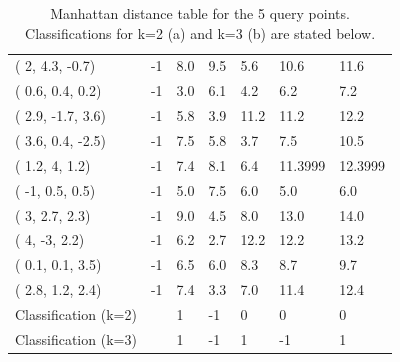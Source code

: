 \documentclass[12pt]{article}
\begin{document}
\begin{table}[h!]
\begin{tabular}{lllllll}
( 2, 4.3, -0.7)      & -1    & 8.0                         & 9.5                         & 5.6                         & 10.6                        & 11.6                           \\
( 0.6, 0.4, 0.2)     & -1    & 3.0                         & 6.1                         & 4.2                         & 6.2                         & 7.2                            \\
( 2.9, -1.7, 3.6)    & -1    & 5.8                         & \cellcolor[HTML]{FFCC67}3.9 & 11.2                        & 11.2                        & 12.2                           \\
( 3.6, 0.4, -2.5)    & -1    & 7.5                         & 5.8                         & \cellcolor[HTML]{FFFE65}3.7 & 7.5                         & 10.5                           \\
( 1.2, 4, 1.2)       & -1    & 7.4                         & 8.1                         & 6.4                         & 11.3999                     & 12.3999                        \\
( -1, 0.5, 0.5)      & -1    & 5.0                         & 7.5                         & 6.0                         & 5.0                         & 6.0                            \\
( 3, 2.7, 2.3)       & -1    & 9.0                         & 4.5                         & 8.0                         & 13.0                        & 14.0                           \\
( 4, -3, 2.2)        & -1    & 6.2                         & \cellcolor[HTML]{FFFE65}2.7 & 12.2                        & 12.2                        & 13.2                           \\
( 0.1, 0.1, 3.5)     & -1    & 6.5                         & 6.0                         & 8.3                         & 8.7                         & 9.7                            \\
( 2.8, 1.2, 2.4)     & -1    & 7.4                         & \cellcolor[HTML]{FFFE65}3.3 & 7.0                         & 11.4                        & 12.4                           \\ \hline
Classification (k=2) &       & 1                           & -1                          & 0                           & 0                           & 0                              \\
Classification (k=3) &       & 1                           & -1                          & 1                           & -1                           & 1                             \\ \hline
\end{tabular}
\caption{Manhattan distance table for the 5 query points. Classifications for k=2 (a) and k=3 (b) are stated below.}
\end{table}
\clearpage
\end{document}
